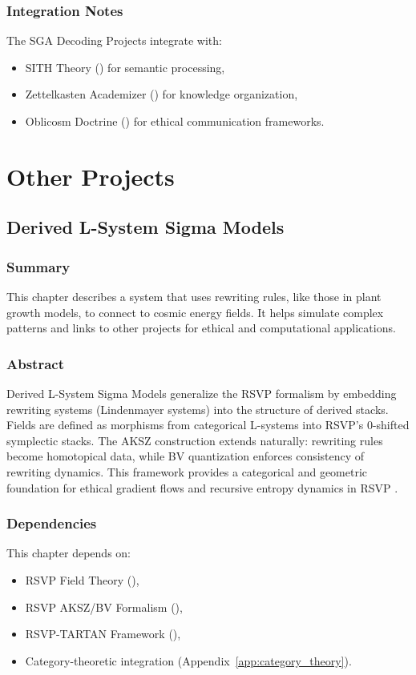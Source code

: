 \documentclass[11pt,oneside]{memoir}
\theoremstyle{plain}
\begin{document}
\section{Integration Notes}
The SGA Decoding Projects integrate with:
\begin{itemize}
    \item SITH Theory () for semantic processing,
    \item Zettelkasten Academizer () for knowledge organization,
    \item Oblicosm Doctrine () for ethical communication frameworks.
\end{itemize}

\part{Other Projects}

\chapter{Derived L-System Sigma Models}
\label{sec:l_system_sigma}

\section{Summary}
This chapter describes a system that uses rewriting rules, like those in plant growth models, to connect to cosmic energy fields. It helps simulate complex patterns and links to other projects for ethical and computational applications.

\section{Abstract}
Derived L-System Sigma Models generalize the RSVP formalism by embedding rewriting systems (Lindenmayer systems) into the structure of derived stacks. Fields are defined as morphisms from categorical L-systems into RSVP’s 0-shifted symplectic stacks. The AKSZ construction extends naturally: rewriting rules become homotopical data, while BV quantization enforces consistency of rewriting dynamics. This framework provides a categorical and geometric foundation for ethical gradient flows and recursive entropy dynamics in RSVP \cite{lindenmayer, aksz}.

\section{Dependencies}
This chapter depends on:
\begin{itemize}
    \item RSVP Field Theory (),
    \item RSVP AKSZ/BV Formalism (),
    \item RSVP-TARTAN Framework (),
    \item Category-theoretic integration (Appendix~\ref{app:category_theory}).
\end{itemize}
\end{document}
